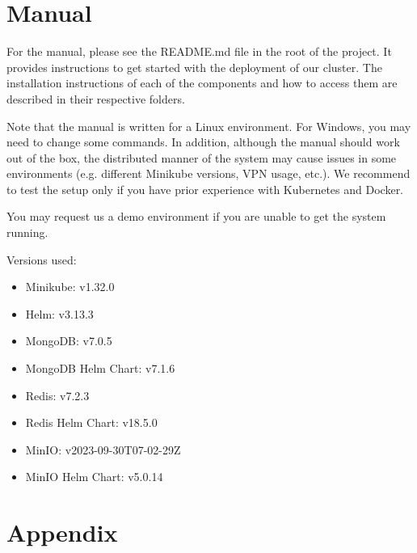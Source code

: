\documentclass{report}
\begin{document}
    \section{Manual}
    For the manual, please see the README.md file in the root of the project. It provides instructions to get started with the deployment of our cluster. The installation instructions of each of the components and how to access them are described in their respective folders.

    Note that the manual is written for a Linux environment. For Windows, you may need to change some commands. In addition, although the manual should work out of the box, the distributed manner of the system may cause issues in some environments (e.g. different Minikube versions, VPN usage, etc.). We recommend to test the setup only if you have prior experience with Kubernetes and Docker.

    You may request us a demo environment if you are unable to get the system running.

    Versions used:
    \begin{itemize}
        \item Minikube: v1.32.0
        \item Helm: v3.13.3
        \item MongoDB: v7.0.5
        \item MongoDB Helm Chart: v7.1.6
        \item Redis: v7.2.3
        \item Redis Helm Chart: v18.5.0
        \item MinIO: v2023-09-30T07-02-29Z
        \item MinIO Helm Chart: v5.0.14
    \end{itemize}

    \section{Appendix}
\end{document}
